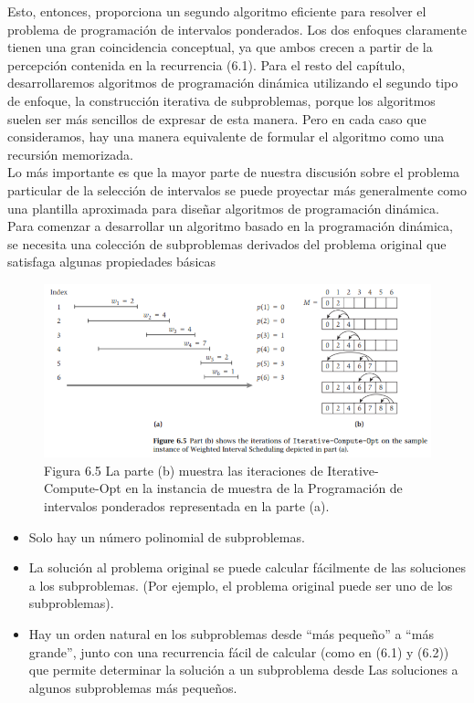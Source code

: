 \documentclass[a4paper, 12pt]{book}
\theoremstyle{dotless}
\begin{document}
Esto, entonces, proporciona un segundo algoritmo eficiente para resolver el problema de programación de intervalos ponderados. Los dos enfoques claramente tienen una gran coincidencia conceptual, ya que ambos crecen a partir de la percepción contenida en la recurrencia (6.1). Para el resto del capítulo, desarrollaremos algoritmos de programación dinámica utilizando el segundo tipo de enfoque, la construcción iterativa de subproblemas, porque los algoritmos suelen ser más sencillos de expresar de esta manera. Pero en cada caso que consideramos, hay una manera equivalente de formular el algoritmo como una recursión memorizada.\\

Lo más importante es que la mayor parte de nuestra discusión sobre el problema particular de la selección de intervalos se puede proyectar más generalmente como una plantilla aproximada para diseñar algoritmos de programación dinámica. Para comenzar a desarrollar un algoritmo basado en la programación dinámica, se necesita una colección de subproblemas derivados del problema original que satisfaga algunas propiedades básicas\\

\begin{figure}[h]
\centering
\includegraphics[scale=0.8]{Imagenes-Seccion6/fig6_5.PNG}
\caption{Figura 6.5 La parte (b) muestra las iteraciones de Iterative-Compute-Opt en la instancia de muestra de la Programación de intervalos ponderados representada en la parte (a).}
\end{figure}

\begin{itemize}

    \item Solo hay un número polinomial de subproblemas.

    \item La solución al problema original se puede calcular fácilmente de las soluciones a los subproblemas. (Por ejemplo, el problema original puede ser uno de los subproblemas).
    
    \item Hay un orden natural en los subproblemas desde ``más pequeño'' a ``más grande'', junto con una recurrencia fácil de calcular (como en (6.1) y (6.2)) que permite determinar la solución a un subproblema desde Las soluciones a algunos subproblemas más pequeños.

\end{itemize}
\end{document}
